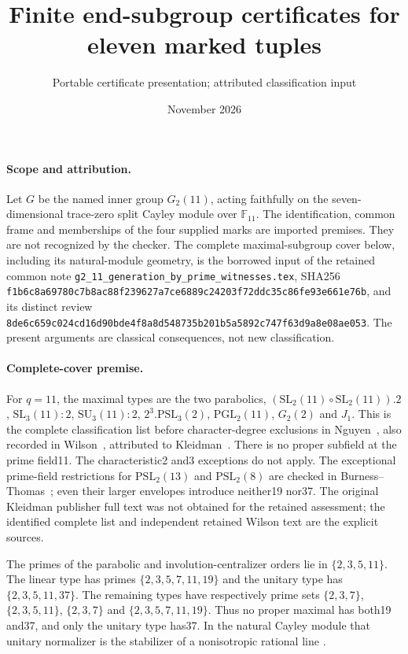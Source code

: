 \documentclass[11pt]{article}
\title{Finite end-subgroup certificates for eleven marked tuples}
\author{Portable certificate presentation; attributed classification input}
\date{November 2026}
\newcommand{\F}{\mathbb F}
\begin{document}
\maketitle
\paragraph{Scope and attribution.}
Let $G$ be the named inner group $G_2(11)$, acting faithfully on the
seven-dimensional trace-zero split Cayley module over $\F_{11}$.
The identification, common frame and memberships of the four supplied
marks are imported premises. They are not recognized by the checker.
The complete maximal-subgroup cover below, including its natural-module
geometry, is the borrowed input of the retained common note
\texttt{g2\_11\_generation\_by\_prime\_witnesses.tex}, SHA256
\texttt{f1b6c8a69780c7b8ac88f239627a7ce6889c24203f72ddc35c86fe93e661e76b},
and its distinct review
\texttt{8de6c659c024cd16d90bde4f8a8d548735b201b5a5892c747f63d9a8e08ae053}.
The present arguments are classical consequences, not new classification.

\paragraph{Complete-cover premise.}
For $q=11$, the maximal types are the two parabolics,
$(\mathrm{SL}_2(11)\circ\mathrm{SL}_2(11)).2$,
$\mathrm{SL}_3(11):2$, $\mathrm{SU}_3(11):2$,
$2^3.\mathrm{PSL}_3(2)$, $\mathrm{PGL}_2(11)$, $G_2(2)$ and $J_1$.
This is the complete classification list before character-degree
exclusions in Nguyen~\cite[proof of Theorem4.4, pp.10--11]{N}, also
recorded in Wilson~\cite[Table4.1]{W}, attributed to Kleidman~\cite{K}.
There is no proper subfield at the prime field11. The characteristic2
and3 exceptions do not apply. The exceptional prime-field restrictions
for $\mathrm{PSL}_2(13)$ and $\mathrm{PSL}_2(8)$ are checked in
Burness--Thomas~\cite[Proposition7.4]{BT}; even their larger envelopes
introduce neither19 nor37. The original Kleidman publisher full text
was not obtained for the retained assessment; the identified complete
list and independent retained Wilson text are the explicit sources.

The primes of the parabolic and involution-centralizer orders lie in
$\{2,3,5,11\}$. The linear type has primes
$\{2,3,5,7,11,19\}$ and the unitary type has
$\{2,3,5,11,37\}$. The remaining types have respectively prime sets
$\{2,3,7\}$, $\{2,3,5,11\}$, $\{2,3,7\}$ and
$\{2,3,5,7,11,19\}$. Thus no proper maximal has both19 and37,
and only the unitary type has37. In the natural Cayley module that
unitary normalizer is the stabilizer of a nonisotropic rational line
\cite[Section4.2.6 in the retained preliminary edition]{W}.
\end{document}
